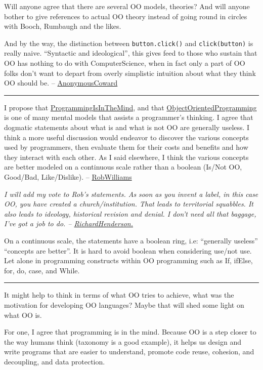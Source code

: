 \documentclass[10pt,twoside,openright]{memoir}
\begin{document}
Will anyone agree that there are several OO models, theories? And will anyone bother to give references to actual OO theory instead of going round in circles with Booch, Rumbaugh and the likes.

And by the way, the distinction between \texttt{button.click()} and \texttt{click(button)} is really naive. ``Syntactic and ideological'', this gives feed to those who sustain that OO has nothing to do with ComputerScience, when in fact only a part of OO folks don't want to depart from overly simplistic intuition about what they think OO should be. -- \ul{AnonymousCoward}

\vskip 0.1in
\hrule
\vskip 0.1in

I propose that \ul{ProgrammingIsInTheMind}, and that \ul{ObjectOrientedProgramming} is one of many mental models that assists a programmer's thinking. I agree that dogmatic statements about what is and what is not OO are generally useless. I think a more useful discussion would endeavor to discover the various concepts used by programmers, then evaluate them for their costs and benefits and how they interact with each other. As I said elsewhere, I think the various concepts are better modeled on a continuous scale rather than a boolean (Is/Not OO, Good/Bad, Like/Dislike). -- \ul{RobWilliams}

\emph{I will add my vote to Rob's statements. As soon as you invent a label, in this case OO, you have created a church/institution. That leads to territorial squabbles. It also leads to ideology, historical revision and denial. I don't need all that baggage, I've got a job to do. -- \ul{RichardHenderson.}}

On a continuous scale, the statements have a boolean ring, i.e: ``generally useless'' ``concepts are better''. It is hard to avoid boolean when considering use/not use. Let alone in programming constructs within OO programming such as If, ifElse, for, do, case, and While.

\vskip 0.1in
\hrule
\vskip 0.1in

It might help to think in terms of what OO tries to achieve, what was the motivation for developing OO languages? Maybe that will shed some light on what OO is.

For one, I agree that programming is in the mind. Because OO is a step closer to the way humans think (taxonomy is a good example), it helps us design and write programs that are easier to understand, promote code reuse, cohesion, and decoupling, and data protection.
\end{document}
